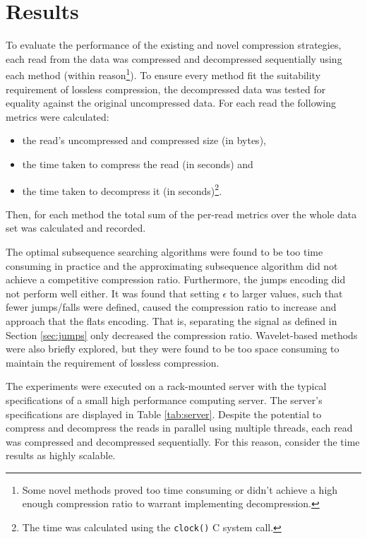 \chapter{Results} \label{chap:results}



To evaluate the performance of the existing and novel compression strategies, each read
from the data was compressed and decompressed sequentially using each method
(within reason\footnote{Some novel methods proved too time consuming or didn't achieve
a high enough compression ratio to warrant implementing decompression.}).  To
ensure every method fit the suitability requirement of lossless compression, the
decompressed data was tested for equality against the original uncompressed
data.  For each read the following metrics were calculated:
\begin{itemize}
	\item the read's uncompressed and compressed size (in bytes),
	\item the time taken to compress the read (in seconds) and
	\item the time taken to decompress it (in seconds)\footnote{The time was calculated
		using the \texttt{clock()}\cite{c-clock} C system call.}.
\end{itemize}
Then, for each method the total sum of the per-read metrics over the whole data
set was calculated and recorded.

The optimal subsequence searching algorithms were found to be too time consuming
in practice and the approximating subsequence algorithm did not achieve a competitive
compression ratio. Furthermore, the jumps encoding did not perform well either.
It was found that setting $\epsilon$ to larger values, such that fewer
jumps/falls were defined, caused the compression ratio to increase and approach
that the flats encoding. That is, separating the signal as defined in Section
\ref{sec:jumps} only decreased the compression ratio. Wavelet-based methods were
also briefly explored, but they were found to be too space consuming to maintain
the requirement of lossless compression.

The experiments were executed on a rack-mounted server with the typical
specifications of a small high performance computing server. The server's
specifications are displayed in Table \ref{tab:server}. Despite the potential to
compress and decompress the reads in parallel using multiple threads, each read
was compressed and decompressed sequentially. For this reason, consider the time
results as highly scalable.

